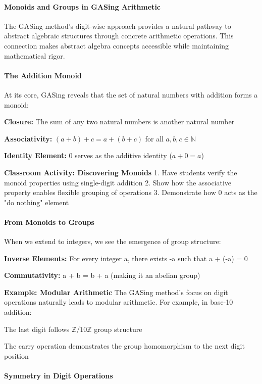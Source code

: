\paragraph{Monoids and Groups in GASing Arithmetic}

The GASing method's digit-wise approach provides a natural pathway to abstract algebraic structures through concrete arithmetic operations. This connection makes abstract algebra concepts accessible while maintaining mathematical rigor.
\paragraph{The Addition Monoid}

At its core, GASing reveals that the set of natural numbers with addition forms a monoid:


\noindent\textbf{\textbf{Closure}:} The sum of any two natural numbers is another natural number


\noindent\textbf{\textbf{Associativity}:} $(a + b) + c = a + (b + c)$ for all $a, b, c \in \mathbb{N}$


\noindent\textbf{\textbf{Identity Element}:} $0$ serves as the additive identity ($a + 0 = a$)


\textbf{Classroom Activity: Discovering Monoids}
1. Have students verify the monoid properties using single-digit addition
2. Show how the associative property enables flexible grouping of operations
3. Demonstrate how 0 acts as the "do nothing" element
\paragraph{From Monoids to Groups}

When we extend to integers, we see the emergence of group structure:


\noindent\textbf{\textbf{Inverse Elements}:} For every integer a, there exists -a such that a + (-a) = 0


\noindent\textbf{\textbf{Commutativity}:} a + b = b + a (making it an abelian group)


\textbf{Example: Modular Arithmetic}
The GASing method's focus on digit operations naturally leads to modular arithmetic. For example, in base-10 addition:

\noindent The last digit follows $\mathbb{Z}/10\mathbb{Z}$ group structure


\noindent The carry operation demonstrates the group homomorphism to the next digit position

\paragraph{Symmetry in Digit Operations}

